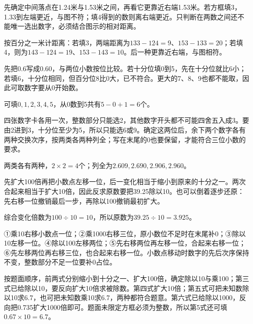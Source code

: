 \documentclass[multi=snippet,border=0pt]{standalone}
\newenvironment{snippet}[3]{\begin{minipage}{#1bp}\color{answerred}\fontsize{#2}{#3}\selectfont\raggedright}{\end{minipage}}
\begin{document}
\begin{snippet}{505}{11.5}{14}先确定中间落点在1.24米与1.53米之间，再看它更靠近右端1.53米。若方框填3，1.33到左端更近，与图不符；填4得到的数则离右端更近。只判断在两数之间还不能唯一选出数字，必须结合图示的相对距离。\par 按百分之一米计距离：若填3，两端距离为\(133-124=9\)、\(153-133=20\)；若填4，则为\(143-124=19\)、\(153-143=10\)。后一种更靠近右端，与图相符。\end{snippet}
\begin{snippet}{505}{11.5}{14}先把0.6写成0.60，与两位小数按位比较。若十分位填0到5，先在十分位就比6小；若填6，十分位相同，但百分位8比0大，已不符合。更大的7、8、9也都不能取，因此可取数字要从0开始数。\par 可填\(0,1,2,3,4,5\)，从0数到5共有\(5-0+1=6\)个。\end{snippet}
\begin{snippet}{505}{11.5}{14}四张数字卡各用一次，整数部分只能选2，其他数字开头都不可能四舍五入成3。要由2进到3，十分位至少为5，所以只能选6或9。确定这两位后，余下两个数字各有两种交换次序，按两类各两种列全；写在末尾的0也要保留，才能符合三位小数的要求。\par 两类各有两种，\(2\times2=4\)个；列全为\(2.609,2.690,2.906,2.960\)。\end{snippet}
\begin{snippet}{505}{11.5}{14}先扩大100倍再把小数点左移一位，后一变化相当于缩小到原来的十分之一。两次合起来相当于扩大10倍，因此反求原数要把39.25除以10。也可以倒着逐步还原：先右移一位撤销最后一步，再除以100撤销最初扩大。\par 综合变化倍数为\(100\div10=10\)，所以原数为\(39.25\div10=3.925\)。\end{snippet}
\begin{snippet}{505}{11.5}{14}①乘10右移小数点一位；②乘1000右移三位，原小数位不足时在末尾补0；③除以10左移一位。④除以100左移两位；⑤先右移两位再左移一位，合起来右移一位；⑥先左移两位再右移三位，也合起来右移一位。小数点移动时数字的先后次序保持不变，整数部分不足一位要补0占位。\end{snippet}
\begin{snippet}{505}{11.5}{14}按题面顺序，前两式分别缩小到十分之一、扩大100倍，确定除以10与乘100；第三式已给除以10，要反向扩大10倍求被除数。第四式扩大10倍；第五式可把未知数除以10求6.7，也可把未知数乘10求6.7，两种都符合题意。第六式已给除以1000，反向把0.735扩大1000倍即可。题面未限定方框必须为整数，所以第5式还可填\(0.67\times10=6.7\)。\end{snippet}
\end{document}
